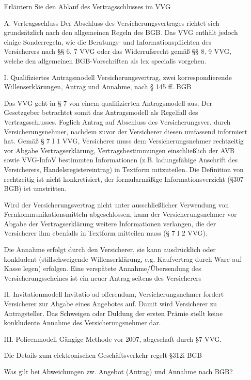 Erläutern Sie den Ablauf des Vertragsschlusses im VVG

A. Vertragsschluss
Der Abschluss des Versicherungsvertrages richtet sich grundsätzlich nach den allgemeinen Regeln des BGB. 
Das VVG enthält jedoch einige Sonderregeln, wie die Beratungs- und Informationspflichten des Versicherers nach §§ 6, 7 VVG 
oder das Widerrufsrecht gemäß §§ 8, 9 VVG, welche den allgemeinen BGB-Vorschriften als lex specialis vorgehen.

I. Qualifiziertes Antragsmodell
Versicherungsvertrag, zwei korrespondierende Willenserklärungen, Antrag und Annahme, nach § 145 ff. BGB

Das VVG geht in § 7 von einem qualifizierten Antragsmodell aus. 
Der Gesetzgeber betrachtet somit das Antragsmodell als Regelfall des Vertragsschlusses. 
Foglich Antrag auf Abschluss des Versicherungsver. durch Versicherungsnehmer, nachdem zuvor der Versicherer diesen umfassend 
informiert hat. 
Gemäß § 7 I 1 VVG, Versicherer muss dem Versicherungsnehmer rechtzeitig vor Abgabe Vertragserklärung, Vertragsbestimmungen einschließlich 
der AVB sowie VVG-InfoV bestimmten Informationen (z.B. ladungsfähige Anschrift des Versicherers, Handelsregistereintrag) in Textform mitzuteilen. 
Die Definition von rechtzeitig ist nicht konkretisiert, der formularmäßige Informationsverzicht (§307 BGB) ist umstritten.

Wird der Versicherungsvertrag nicht unter ausschließlicher Verwendung von Fernkommunikationsmitteln abgeschlossen, 
kann der Versicherungsnehmer vor Abgabe der Vertragserklärung weitere Informationen verlangen, die der Versicherer ihm ebenfalls in 
Textform mitteilen muss (§ 7 I 2 VVG).

Die Annahme erfolgt durch den Versicherer, sie kann ausdrücklich oder konkludent (stillschweigende Willenserklärung, 
e.g. Kaufvertrag durch Ware auf Kasse legen) erfolgen.
Eine verspätete Annahme/Übersendung des Versicherungsscheines ist ein neuer Antrag seitens des Versicherers

II. Invitationmodell
Invitatio ad offerendum, Versicherungsnehmer fordert Versicherer zur Abgabe eines Angebotes auf.
Damit wird Versicherer zu Antragsteller.
Das Schweigen oder Duldung der ersten Prämie stellt keine konkludente Annahme des Versicherungsnehmer dar.

III. Policenmodell
Gängige Methode vor 2007, abgeschaft durch §7 VVG.

Die Details zum elektronischen Geschäftsverkehr regelt §312i BGB


Was gilt bei Abweichungen zw. Angebot (Antrag) und Annahme nach BGB?

